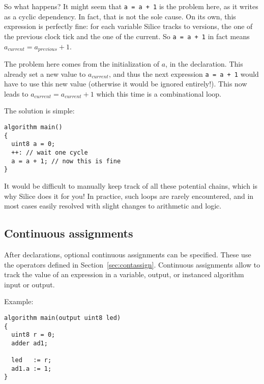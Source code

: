 \documentclass[a4]{article}
\newcommand\silice{Silice}
\begin{document}
So what happens? It might seem that \texttt{a = a + 1} is the problem here, as it writes as a cyclic dependency. In fact, that is not the sole cause. On its own, this expression is perfectly fine: for each variable \silice{} tracks to versions, the one of the previous clock tick and the one of the current. So \texttt{a = a + 1} in fact means $a_{current} = a_{previous} + 1$.

The problem here comes from the initialization of $a$, in the declaration. This already set a new value to $a_{current}$, and thus the next expression \texttt{a = a + 1} would have to use this new value (otherwise it would be ignored entirely!). This now leads to $a_{current} = a_{current} + 1$ which this time is a combinational loop.

\vspace*{2mm}
\noindent The solution is simple:
\begin{verbatim}
algorithm main()
{
  uint8 a = 0;
  ++: // wait one cycle
  a = a + 1; // now this is fine
}
\end{verbatim}

It would be difficult to manually keep track of all these potential chains, which is why \silice{} does it for you! In practice, such loops are rarely encountered, and in most cases easily resolved with slight changes to arithmetic and logic.

\vspace*{5mm}
\noindent
{}


\subsection{Continuous assignments}

After declarations, optional continuous assignments can be specified.
These use the operators defined in Section~\ref{sec:contassign}.
%
Continuous assignments allow to track the value of an expression
in a variable, output, or instanced algorithm input or output.

\noindent Example:
\begin{verbatim}
algorithm main(output uint8 led)
{
  uint8 r = 0;
  adder ad1;

  led   := r;
  ad1.a := 1;
}
\end{verbatim}
\end{document}
